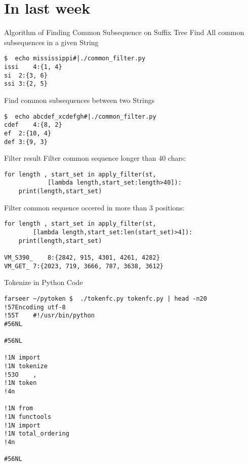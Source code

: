 \section{In last week} 

\begin{frame}[fragile]{Algorithm of Finding Common Subsequence on Suffix Tree}%
Find All common subsequences in a given String

\begin{lstlisting}
$  echo mississippi#|./common_filter.py 
issi	4:{1, 4}
si	2:{3, 6}
ssi	3:{2, 5}    
\end{lstlisting}

Find common subsequences between two Strings

\begin{lstlisting}
$  echo abcdef_xcdefgh#|./common_filter.py 
cdef	4:{8, 2}
ef	2:{10, 4}
def	3:{9, 3}

\end{lstlisting}

\end{frame}

\begin{frame}[fragile]{Filter result}
Filter common sequence longer than 40 chars:
\begin{lstlisting}
for length , start_set in apply_filter(st,
            [lambda length,start_set:length>40]):
    print(length,start_set)
\end{lstlisting}

Filter common sequence occered in more than 3 positions:

\begin{lstlisting}
for length , start_set in apply_filter(st,
        [lambda length,start_set:len(start_set)>4]):
    print(length,start_set)

VM_S390_	8:{2842, 915, 4301, 4261, 4282}
VM_GET_	7:{2023, 719, 3666, 787, 3638, 3612}
\end{lstlisting}


\end{frame}

\begin{frame}[fragile]{Tokenize in Python Code}

\begin{lstlisting}
farseer ~/pytoken $  ./tokenfc.py tokenfc.py | head -n20
!57Encoding	utf-8
!55T	#!/usr/bin/python
#56NL	

#56NL	

!1N	import
!1N	tokenize
!53O	,
!1N	token
!4n	

!1N	from
!1N	functools
!1N	import
!1N	total_ordering
!4n	

#56NL	

\end{lstlisting}
\end{frame}


